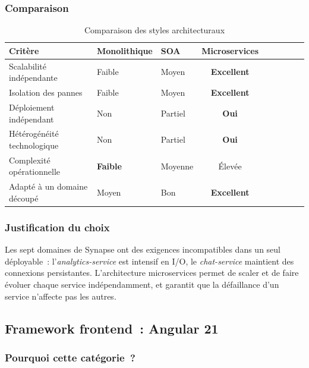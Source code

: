 \subsubsection*{Comparaison}

\begin{table}[H]
\centering
\caption{Comparaison des styles architecturaux}
\label{tab:cmp_architecture}
\begin{tabularx}{\textwidth}{VlVCVCVCV}
\hline
\textbf{Critère} & \textbf{Monolithique} & \textbf{SOA} & \textbf{Microservices} \\
\hline
Scalabilité indépendante     & Faible   & Moyen    & \textbf{Excellent} \\
\hline
Isolation des pannes         & Faible   & Moyen    & \textbf{Excellent} \\
\hline
Déploiement indépendant      & Non      & Partiel  & \textbf{Oui} \\
\hline
Hétérogénéité technologique  & Non      & Partiel  & \textbf{Oui} \\
\hline
Complexité opérationnelle    & \textbf{Faible} & Moyenne & Élevée \\
\hline
Adapté à un domaine découpé  & Moyen    & Bon      & \textbf{Excellent} \\
\hline
\end{tabularx}
\end{table}

\subsubsection*{Justification du choix}

Les sept domaines de Synapse ont des exigences incompatibles dans un seul déployable~: l'\textit{analytics-service} est intensif en I/O, le \textit{chat-service} maintient des connexions persistantes. L'architecture microservices permet de scaler et de faire évoluer chaque service indépendamment, et garantit que la défaillance d'un service n'affecte pas les autres.

\subsection{Framework frontend~: Angular 21}

\subsubsection*{Pourquoi cette catégorie~?}

